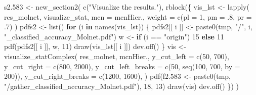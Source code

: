 \documentclass[
]{article}
\newenvironment{Shaded}{\begin{snugshade}}{\end{snugshade}}
\newcommand{\AttributeTok}[1]{\textcolor[rgb]{0.77,0.63,0.00}{#1}}
\newcommand{\ControlFlowTok}[1]{\textcolor[rgb]{0.13,0.29,0.53}{\textbf{#1}}}
\newcommand{\DecValTok}[1]{\textcolor[rgb]{0.00,0.00,0.81}{#1}}
\newcommand{\FloatTok}[1]{\textcolor[rgb]{0.00,0.00,0.81}{#1}}
\newcommand{\FunctionTok}[1]{\textcolor[rgb]{0.00,0.00,0.00}{#1}}
\newcommand{\NormalTok}[1]{#1}
\newcommand{\OtherTok}[1]{\textcolor[rgb]{0.56,0.35,0.01}{#1}}
\newcommand{\SpecialCharTok}[1]{\textcolor[rgb]{0.00,0.00,0.00}{#1}}
\newcommand{\StringTok}[1]{\textcolor[rgb]{0.31,0.60,0.02}{#1}}
\begin{document}
\begin{Shaded}
\begin{Highlighting}[]
\NormalTok{s2}\FloatTok{.583} \OtherTok{\textless{}{-}} \FunctionTok{new\_section2}\NormalTok{(}
  \FunctionTok{c}\NormalTok{(}\StringTok{"Visualize the results."}\NormalTok{),}
  \FunctionTok{rblock}\NormalTok{(\{}
\NormalTok{    vis\_lst }\OtherTok{\textless{}{-}} \FunctionTok{lapply}\NormalTok{(}
\NormalTok{      res\_molnet, visualize\_stat, }\AttributeTok{mcn =}\NormalTok{ mcnHier.,}
      \AttributeTok{weight =} \FunctionTok{c}\NormalTok{(}\AttributeTok{pl =} \DecValTok{1}\NormalTok{, }\AttributeTok{pm =}\NormalTok{ .}\DecValTok{8}\NormalTok{, }\AttributeTok{pr =}\NormalTok{ .}\DecValTok{7}\NormalTok{)}
\NormalTok{    )}
\NormalTok{    pdfs2 }\OtherTok{\textless{}{-}} \FunctionTok{list}\NormalTok{()}
    \ControlFlowTok{for}\NormalTok{ (i }\ControlFlowTok{in} \FunctionTok{names}\NormalTok{(vis\_lst)) \{}
\NormalTok{      pdfs2[[ i ]] }\OtherTok{\textless{}{-}} \FunctionTok{paste0}\NormalTok{(tmp, }\StringTok{"/"}\NormalTok{, i, }\StringTok{"\_classified\_accuracy\_Molnet.pdf"}\NormalTok{)}
\NormalTok{      w }\OtherTok{\textless{}{-}} \ControlFlowTok{if}\NormalTok{ (i }\SpecialCharTok{==} \StringTok{"origin"}\NormalTok{) }\DecValTok{15} \ControlFlowTok{else} \DecValTok{11}
      \FunctionTok{pdf}\NormalTok{(pdfs2[[ i ]], w, }\DecValTok{11}\NormalTok{)}
      \FunctionTok{draw}\NormalTok{(vis\_lst[[ i ]])}
      \FunctionTok{dev.off}\NormalTok{()}
\NormalTok{    \}}
\NormalTok{    vis }\OtherTok{\textless{}{-}} \FunctionTok{visualize\_statComplex}\NormalTok{(}
\NormalTok{      res\_molnet, mcnHier.,}
      \AttributeTok{y\_cut\_left =} \FunctionTok{c}\NormalTok{(}\DecValTok{50}\NormalTok{, }\DecValTok{700}\NormalTok{),}
      \AttributeTok{y\_cut\_right =} \FunctionTok{c}\NormalTok{(}\DecValTok{800}\NormalTok{, }\DecValTok{2000}\NormalTok{),}
      \AttributeTok{y\_cut\_left\_breaks =} \FunctionTok{c}\NormalTok{(}\DecValTok{50}\NormalTok{, }\FunctionTok{seq}\NormalTok{(}\DecValTok{100}\NormalTok{, }\DecValTok{700}\NormalTok{, }\AttributeTok{by =} \DecValTok{200}\NormalTok{)),}
      \AttributeTok{y\_cut\_right\_breaks =} \FunctionTok{c}\NormalTok{(}\DecValTok{1200}\NormalTok{, }\DecValTok{1600}\NormalTok{),}
\NormalTok{    )}
    \FunctionTok{pdf}\NormalTok{(f2}\FloatTok{.583} \OtherTok{\textless{}{-}} \FunctionTok{paste0}\NormalTok{(tmp, }\StringTok{"/gather\_classified\_accuracy\_Molnet.pdf"}\NormalTok{), }\DecValTok{18}\NormalTok{, }\DecValTok{13}\NormalTok{)}
    \FunctionTok{draw}\NormalTok{(vis)}
    \FunctionTok{dev.off}\NormalTok{()}
\NormalTok{  \})}
\NormalTok{)}


\end{Highlighting}
\end{Shaded}
\end{document}
